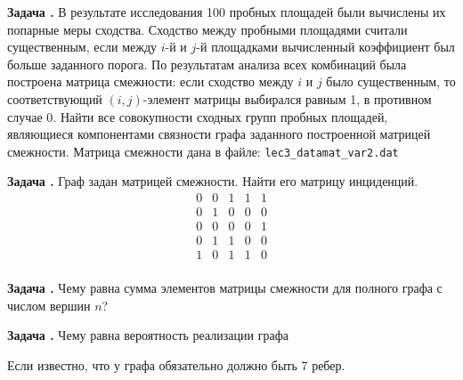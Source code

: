\documentclass[12pt, a4paper]{article}
\newcounter{tasknum}
\newcommand{\task}{\addtocounter{tasknum}{1}
\textbf{Задача \arabic{tasknum}.\,\,}}
\begin{document}
\task В результате исследования 100 пробных площадей были вычислены их попарные меры сходства. 
Сходство между пробными площадями считали существенным, если между $i$-й и $j$-й площадками
вычисленный коэффициент был больше заданного порога. По результатам анализа всех комбинаций была
построена матрица смежности: если сходство между $i$ и $j$ было существенным, то соответствующий $(i,j)$-элемент
матрицы выбирался равным 1, в противном случае 0. Найти все совокупности сходных групп пробных площадей, являющиеся
компонентами связности графа заданного построенной матрицей смежности. Матрица смежности дана в файле: 
\texttt{lec3_datamat_var2.dat}


\task Граф задан матрицей смежности. Найти его матрицу инциденций.
$$
\begin{array}{lllll}
0 & 0 & 1 & 1 & 1\\
0 & 1 & 0 & 0 & 0\\
0 & 0 & 0 & 0 & 1\\
0 & 1 & 1 & 0 & 0\\
1 & 0 & 1 & 1 & 0\\
\end{array}
$$


\task Чему равна сумма элементов матрицы смежности для полного графа с числом вершин $n$? 
 
\task Чему равна вероятность реализации графа
Если известно, что у графа обязательно должно быть 7 ребер. 
 
 
\end{document}
